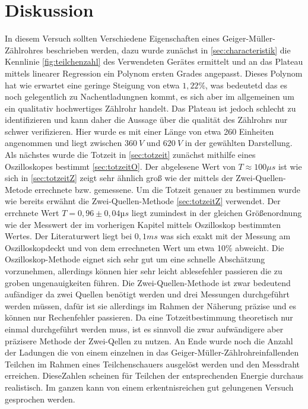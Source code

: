 \section{Diskussion}
\label{sec:diskussion}
In diesem Versuch sollten Verschiedene Eigenschaften eines Geiger-Müller-Zählrohres beschrieben werden, dazu 
wurde zunächst in \autoref{sec:characteristik} die Kennlinie \autoref{fig:teilchenzahl} 
des Verwendeten Gerätes ermittelt und an das Plateau mittels linearer Regression ein Polynom ersten Grades 
angepasst. Dieses Polynom hat wie erwartet eine geringe Steigung von etwa $1,22\%$, was bedeutetd das es noch 
gelegentlich zu Nachentladungnen kommt, es sich aber im allgemeinen um ein qualitativ hochwertiges Zählrohr handelt.
Das Plateau ist jedoch schlecht zu identifizieren und kann daher die Aussage über die qualität des Zählrohrs nur  schwer
verifizieren. Hier wurde es mit einer Länge von etwa 260 Einheiten angenommen und liegt 
zwischen $\SI{360}{V}$ und $\SI{620}{V}$ in der gewählten Darstellung. Als nächstes wurde die Totzeit in 
\autoref{sec:totzeit} zunächst mithilfe eines Oszilloskopes bestimmt \autoref{sec:totzeitO}. 
Der abgelesene Wert von $T\approx 100\mu s$ ist wie sich in \autoref{sec:totzeitZ} zeigt sehr ähnlich groß wie
der mittels der Zwei-Quellen-Metode errechnete bzw. gemessene. Um die Totzeit genauer zu bestimmen wurde wie 
bereits erwähnt die Zwei-Quellen-Methode \autoref{sec:totzeitZ} verwendet. Der errchnete Wert $T=0,96\pm0,04µs$
liegt zumindest in der gleichen Größenordnung wie der Messwert der im vorherigen Kapitel mittels Oszilloskop 
bestimmten Wertes. Der Literaturwert liegt bei $0,1ms$ was sich exakt mit der Messung am Oszilloskopdeckt und
von dem errechneten Wert um etwa 10\% abweicht. Die Oszilloskop-Methode eignet sich sehr gut um eine schnelle 
Abschätzung vorzunehmen, allerdings können hier sehr leicht ablesefehler passieren die zu groben ungenauigkeiten
führen. Die Zwei-Quellen-Methode ist zwar bedeutend aufändiger da zwei Quellen benötigt werden und drei Messungen 
durchgeführt werden müssen, dafür ist sie allerdings im Rahmen der Näherung präzise und es können nur Rechenfehler 
passieren. Da eine Totzeitbestimmung theoretisch nur einmal durchgeführt werden muss, ist es sinnvoll die zwar 
aufwändigere aber präzisere Methode der Zwei-Qellen zu nutzen.  An Ende wurde noch die Anzahl der Ladungen die 
von einem einzelnen in das Geiger-Müller-Zählrohreinfallenden Teilchen im Rahmen eines Teilchenschauers 
ausgelöst werden und den Messdraht erreichen. DieseZahlen scheinen für Teilchen der entsprechenden Energie 
durchaus realistisch. Im ganzen kann von einem erkentnisreichen gut gelungenen Versuch gesprochen werden.

